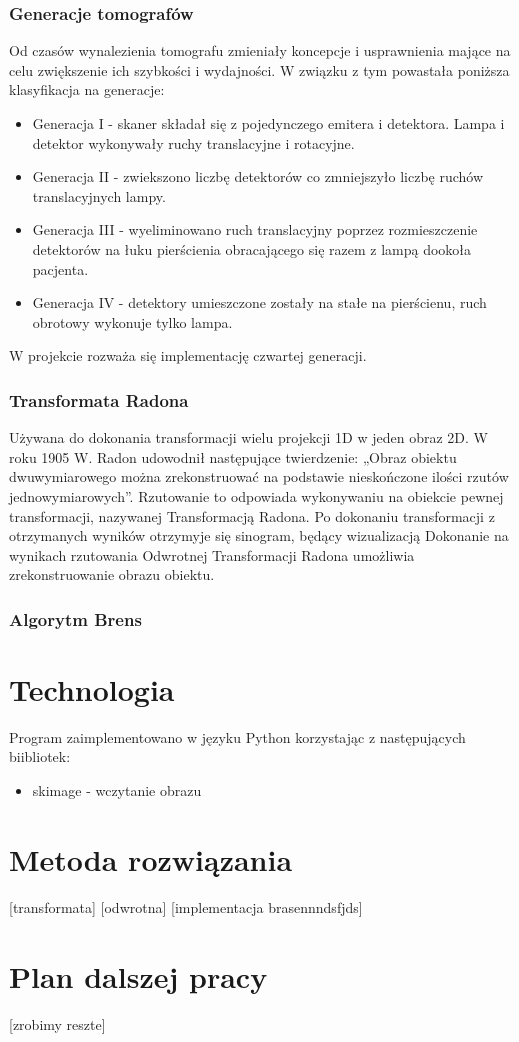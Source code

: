 \documentclass[A_4paper,12pt]{article}
\begin{document}
\subsubsection{Generacje tomografów}
Od czasów wynalezienia tomografu zmieniały koncepcje i usprawnienia mające na celu zwiększenie ich szybkości i wydajności.
W związku z tym powastała poniższa klasyfikacja na generacje:
\begin{itemize}
\item Generacja I - skaner składał się z pojedynczego emitera i detektora. Lampa i detektor wykonywały ruchy translacyjne i rotacyjne.
\item Generacja II - zwiekszono liczbę detektorów co zmniejszyło liczbę ruchów translacyjnych lampy.
\item Generacja III - wyeliminowano ruch translacyjny poprzez rozmieszczenie detektorów na łuku pierścienia obracającego się razem z lampą dookoła pacjenta.
\item Generacja IV - detektory umieszczone zostały na stałe na pierścienu, ruch obrotowy wykonuje tylko lampa.
\end{itemize}

W projekcie rozważa się implementację czwartej generacji.

\subsubsection{Transformata Radona}
Używana do dokonania transformacji wielu projekcji 1D w jeden obraz 2D.
W roku 1905 W. Radon udowodnił następujące twierdzenie: „Obraz obiektu dwuwymiarowego można zrekonstruować na podstawie nieskończone ilości rzutów jednowymiarowych”. Rzutowanie to odpowiada wykonywaniu na obiekcie pewnej transformacji, nazywanej Transformacją Radona. 
Po dokonaniu transformacji z otrzymanych wyników otrzymyje się sinogram, będący wizualizacją
Dokonanie na wynikach rzutowania Odwrotnej Transformacji Radona umożliwia zrekonstruowanie obrazu obiektu.

\subsubsection{Algorytm Brens}


\section{Technologia}
Program zaimplementowano w języku Python korzystając z następujących biibliotek:
\begin{itemize}
\item skimage - wczytanie obrazu
\end{itemize}

\section{Metoda rozwiązania}
[transformata]
[odwrotna]
[implementacja brasennndsfjds]

\section{Plan dalszej pracy}
[zrobimy reszte]




\end{document}
